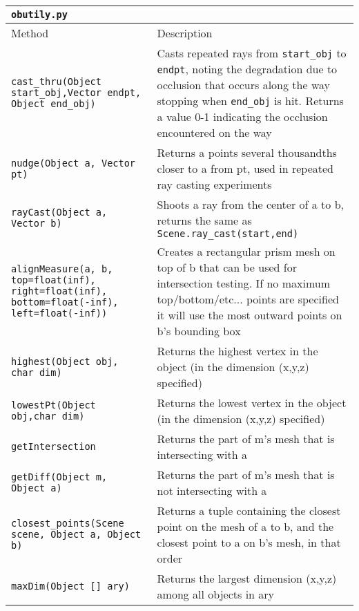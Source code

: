 \begin{longtable}{|p{5cm}|p{10cm}|}
	\cline{0-0}
	\small
	\texttt{obutily.py}  \\\hline
	Method & Description \\\hline
	
	\texttt{cast\_thru(Object start\_obj,Vector endpt, Object end\_obj)}
	&Casts repeated rays from \texttt{start\_obj} to \texttt{endpt}, noting the degradation due to occlusion that occurs along the way stopping when \texttt{end\_obj} is hit. Returns a value 0-1 indicating the occlusion encountered on the way \\\hline
	
	\texttt{nudge(Object a, Vector pt)} & Returns a points several thousandths closer to a from pt, used in repeated ray casting experiments \\\hline
	
	\texttt{rayCast(Object a, Vector b)} & Shoots a ray from the center of a to b, returns the same as \texttt{Scene.ray\_cast(start,end)} \\\hline
	
	\texttt{alignMeasure(a, b, top=float(inf), right=float(inf),
	bottom=float(-inf), left=float(-inf))} & Creates a rectangular prism mesh on top of b that can be used for intersection testing. If no maximum top/bottom/etc... points are specified it will use the most outward points on b's bounding box \\\hline	
	
	\texttt{highest(Object obj, char dim)} & Returns the highest vertex in the object (in the dimension (x,y,z) specified) \\\hline
	
	\texttt{lowestPt(Object obj,char dim)} & Returns the lowest vertex in the object (in the dimension (x,y,z) specified) \\\hline
	
	\texttt{getIntersection} & Returns the part of m's mesh that is intersecting with a \\\hline
	
	\texttt{getDiff(Object m, Object a)} & Returns the part of m's mesh that is not intersecting with a \\\hline
	
	\texttt{closest\_points(Scene scene, Object a, Object b)} & Returns a tuple containing the closest point on the mesh of a to b, and the closest point to a on b's mesh, in that order \\\hline
	
	\texttt{maxDim(Object [] ary)} & Returns the largest dimension (x,y,z) among all objects in ary \\\hline
	

\end{longtable}
